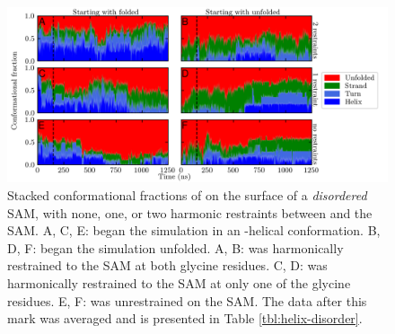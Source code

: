 \begin{figure}
    \center
    \includegraphics[width=\double]{figures-helix/disordered_helicity.png}
    \caption{
        Stacked conformational fractions of \pep{} on the surface of a \emph{disordered} SAM, with none, one, or two harmonic restraints between \pep{} and the SAM. 
        A, C, E: \pep{} began the simulation in an \textalpha{}-helical conformation. 
        B, D, F: \pep{} began the simulation unfolded. 
        A, B: \pep{} was harmonically restrained to the SAM at both glycine residues. 
        C, D: \pep{} was harmonically restrained to the SAM at only one of the glycine residues. 
        E, F: \pep{} was unrestrained on the SAM. 
        The data after this mark was averaged and is presented in Table \ref{tbl:helix-disorder}. 
    }
    \label{fig:helix-disorder}
\end{figure}

\begin{table}
    \caption{Average conformational fractions from simulations of \pep{} on the surface of a \emph{disordered} SAM in which either none, one, or both of the glycine residues in the peptide are harmonically restrained to the SAM.}
    \begin{center}
    \end{center}
    \label{tbl:helix-disorder}
\end{table}

